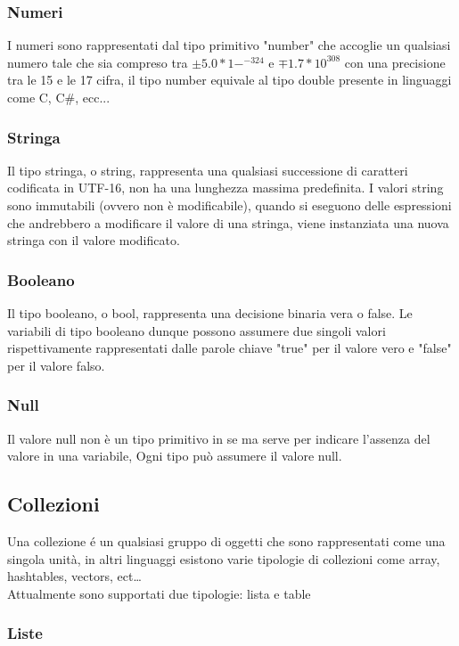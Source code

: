 \subsubsection{Numeri}
I numeri sono rappresentati dal tipo primitivo "number" che accoglie un qualsiasi numero tale che
sia compreso tra \( \pm5.0*1-^{-324} \) e \(\mp 1.7*10^308\) con una precisione tra le 15 e le 17
cifra, il tipo number equivale al tipo double presente in linguaggi come C, C\#, ecc...

\subsubsection{Stringa}
Il tipo stringa, o string, rappresenta una qualsiasi successione di caratteri codificata in UTF-16, 
non ha una lunghezza massima predefinita.
I valori string sono immutabili (ovvero non è modificabile), quando si eseguono delle espressioni
che andrebbero a modificare il valore di una stringa, viene instanziata una nuova stringa con il valore
modificato.

\subsubsection{Booleano}
Il tipo booleano, o bool, rappresenta una decisione binaria vera o false.
Le variabili di tipo booleano dunque possono assumere due singoli valori rispettivamente 
rappresentati dalle parole chiave "true" per il valore vero e "false" per il valore falso.

\subsubsection{Null}
Il valore null non è un tipo primitivo in se ma serve per indicare l'assenza del valore in una variabile,
Ogni tipo può assumere il valore null.

\subsection{Collezioni}
Una collezione é un qualsiasi gruppo di oggetti che sono rappresentati come una singola unità,
in altri linguaggi esistono varie tipologie di collezioni come array, hashtables, vectors, ect\dots \\
Attualmente sono supportati due tipologie: lista e table

\subsubsection{Liste}


